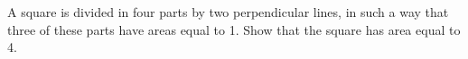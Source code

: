 A square is divided in four parts by two perpendicular lines, in such a way that three of these parts have areas equal to 1. Show that the square has area equal to 4.